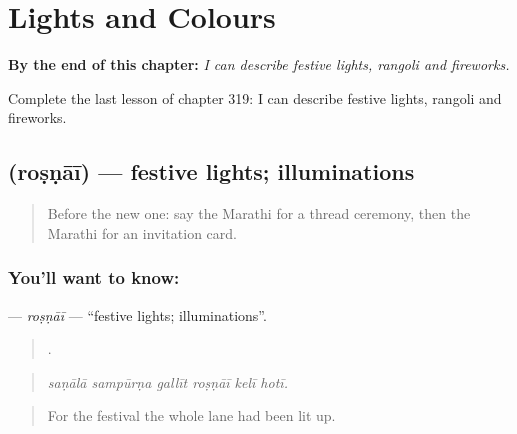 
\chapter{Lights and Colours}
\label{ch:mr-lights-and-colours}

\begin{chapteropening}
\textbf{By the end of this chapter:} \emph{I can describe festive lights, rangoli and fireworks.}

Complete the last lesson of chapter 319: I can describe festive lights, rangoli and fireworks.
\end{chapteropening}

\section[\texorpdfstring{\mr{रोषणाई} (roṣṇāī)}{रोषणाई (roṣṇāī)}]{ (roṣṇāī) — festive lights; illuminations}

\label{lesson:MR-C319-rosnai}



\begin{quote}
Before the new one: say the Marathi for a thread ceremony, then the Marathi for an invitation card.
\end{quote}

\subsection*{You'll want to know: }
\textbf{} — \emph{roṣṇāī} — \textquotedblleft{}festive lights; illuminations\textquotedblright{}.

\begin{quote}
     .
\end{quote}

\begin{quote}
\emph{saṇālā sampūrṇa gallīt roṣṇāī kelī hotī.}
\end{quote}

\begin{quote}
For the festival the whole lane had been lit up.
\end{quote}

